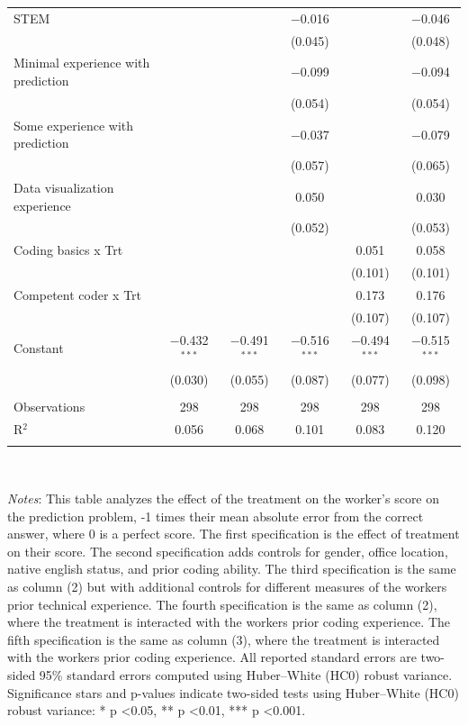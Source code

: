 \begin{table}[!htbp]
\begin{tabular}{@{\extracolsep{-5pt}}lccccc}
  STEM &  &  & $-$0.016 &  & $-$0.046 \\ 
  &  &  & (0.045) &  & (0.048) \\ 
  Minimal experience with prediction &  &  & $-$0.099 &  & $-$0.094 \\ 
  &  &  & (0.054) &  & (0.054) \\ 
  Some experience with prediction &  &  & $-$0.037 &  & $-$0.079 \\ 
  &  &  & (0.057) &  & (0.065) \\ 
  Data visualization experience &  &  & 0.050 &  & 0.030 \\ 
  &  &  & (0.052) &  & (0.053) \\ 
  Coding basics x Trt &  &  &  & 0.051 & 0.058 \\ 
  &  &  &  & (0.101) & (0.101) \\ 
  Competent coder x Trt &  &  &  & 0.173 & 0.176 \\ 
  &  &  &  & (0.107) & (0.107) \\ 
  Constant & $-$0.432$^{***}$ & $-$0.491$^{***}$ & $-$0.516$^{***}$ & $-$0.494$^{***}$ & $-$0.515$^{***}$ \\ 
  & (0.030) & (0.055) & (0.087) & (0.077) & (0.098) \\ 
 \hline \\[-1.8ex] 
Observations & 298 & 298 & 298 & 298 & 298 \\ 
R$^{2}$ & 0.056 & 0.068 & 0.101 & 0.083 & 0.120 \\ 
\hline 
\hline \\[-1.8ex] 
\end{tabular}
\\
\begin{minipage}{\textwidth}
{\footnotesize \emph{Notes}: This table analyzes the effect of the treatment on the worker's score on the prediction problem, -1 times their mean absolute error from the correct answer, where 0 is a perfect score. The first specification is the effect of treatment on their score. The second specification adds controls for gender, office location, native english status, and prior coding ability. The third specification is the same as column (2) but with additional controls for different measures of the workers prior technical experience. The fourth specification is the same as column (2), where the treatment is interacted with the workers prior coding experience. The fifth specification is the same as column (3), where the treatment is interacted with the workers prior coding experience. All reported standard errors are two-sided 95\% standard errors computed using Huber--White (HC0) robust variance. Significance stars and p-values indicate two-sided tests using Huber--White (HC0) robust variance: * p \textless 0.05, ** p \textless 0.01, *** p \textless 0.001.}
\end{minipage}
\end{table}
